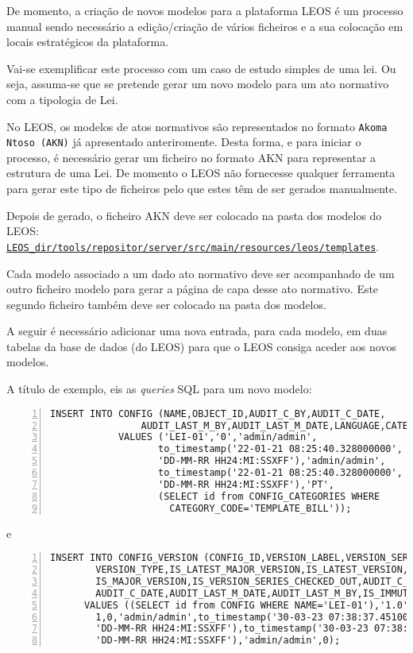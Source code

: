 De momento, a criação de novos modelos para a plataforma LEOS é um processo manual sendo necessário a edição/criação de vários 
ficheiros e a sua colocação em locais estratégicos da plataforma.

Vai-se exemplificar este processo com um caso de estudo simples de uma lei.
Ou seja, assuma-se que se pretende gerar um novo modelo para um ato normativo com a tipologia de Lei.
 
No LEOS, os modelos de atos normativos são representados no formato \texttt{Akoma Ntoso (AKN)} já apresentado anteriromente. 
Desta forma, e para iniciar o processo, é necessário gerar um ficheiro no formato AKN para representar a estrutura de uma Lei. 
De momento o LEOS não fornecesse qualquer ferramenta para gerar este tipo de ficheiros pelo que estes têm de ser gerados 
manualmente.

Depois de gerado, o ficheiro AKN deve ser colocado na pasta dos modelos do LEOS: 
\texttt{\url{LEOS_dir/tools/repositor/server/src/main/resources/leos/templates}}.

Cada modelo associado a um dado ato normativo deve ser acompanhado de um outro ficheiro modelo para gerar a página de capa 
desse ato normativo. Este segundo ficheiro também deve ser colocado na pasta dos modelos.
 
A seguir é necessário adicionar uma nova entrada, para cada modelo, em duas tabelas da base de dados (do LEOS) 
para que o LEOS consiga aceder aos novos modelos.

A título de exemplo, eis as \emph{queries} SQL para um novo modelo:

\begin{Verbatim}[frame=single, numbers=left, fontsize=\scriptsize, commandchars=\\\{\}]
    INSERT INTO CONFIG (NAME,OBJECT_ID,AUDIT_C_BY,AUDIT_C_DATE,
                AUDIT_LAST_M_BY,AUDIT_LAST_M_DATE,LANGUAGE,CATEGORY_ID) 
            VALUES ('LEI-01','0','admin/admin',
                   to_timestamp('22-01-21 08:25:40.328000000',
                   'DD-MM-RR HH24:MI:SSXFF'),'admin/admin',
                   to_timestamp('22-01-21 08:25:40.328000000',
                   'DD-MM-RR HH24:MI:SSXFF'),'PT',
                   (SELECT id from CONFIG_CATEGORIES WHERE 
                     CATEGORY_CODE='TEMPLATE_BILL'));
\end{Verbatim}

e

\begin{Verbatim}[frame=single, numbers=left, fontsize=\scriptsize, commandchars=\\\{\}]
    INSERT INTO CONFIG_VERSION (CONFIG_ID,VERSION_LABEL,VERSION_SERIES_ID,
        VERSION_TYPE,IS_LATEST_MAJOR_VERSION,IS_LATEST_VERSION,
        IS_MAJOR_VERSION,IS_VERSION_SERIES_CHECKED_OUT,AUDIT_C_BY,
        AUDIT_C_DATE,AUDIT_LAST_M_DATE,AUDIT_LAST_M_BY,IS_IMMUTABLE) 
      VALUES ((SELECT id from CONFIG WHERE NAME='LEI-01'),'1.0','1',null,1,1,
        1,0,'admin/admin',to_timestamp('30-03-23 07:38:37.451000000',
        'DD-MM-RR HH24:MI:SSXFF'),to_timestamp('30-03-23 07:38:37.496000000',
        'DD-MM-RR HH24:MI:SSXFF'),'admin/admin',0);
\end{Verbatim}


